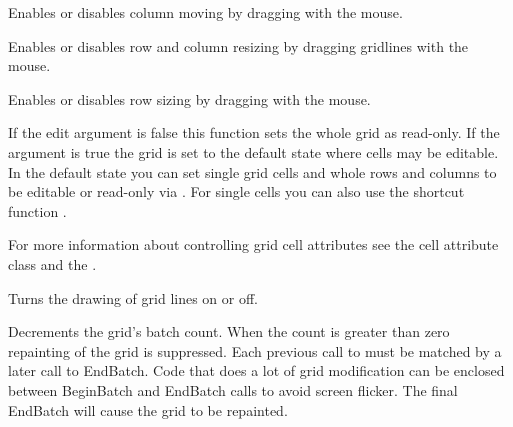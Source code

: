 Enables or disables column moving by dragging with the mouse.



\label{wxgridenabledraggridsize}


Enables or disables row and column resizing by dragging gridlines with the mouse.



\label{wxgridenabledragrowsize}


Enables or disables row sizing by dragging with the mouse.



\label{wxgridenableediting}


If the edit argument is false this function sets the whole grid as read-only. If the
argument is true the grid is set to the default state where cells may be editable. In the
default state you can set single grid cells and whole rows and columns to be editable or
read-only via
. For single
cells you can also use the shortcut function
.

For more information about controlling grid cell attributes see the
 cell attribute class and the
.



\label{wxgridenablegridlines}


Turns the drawing of grid lines on or off.



\label{wxgridendbatch}


Decrements the grid's batch count. When the count is greater than zero repainting of
the grid is suppressed. Each previous call to
 must be matched by a later call to
EndBatch. Code that does a lot of grid modification can be enclosed between
BeginBatch and EndBatch calls to avoid screen flicker. The final EndBatch will
cause the grid to be repainted.



